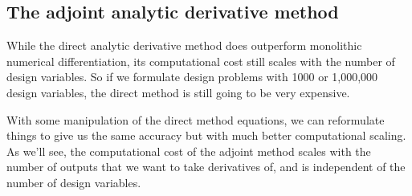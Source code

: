 \documentclass[conf]{new-aiaa}
\begin{document}
    
    \subsection{The adjoint analytic derivative method}

    While the direct analytic derivative method does outperform monolithic numerical differentiation, its computational cost still scales with the number of design variables. 
    So if we formulate design problems with 1000 or 1,000,000 design variables, the direct method is still going to be very expensive. 

    With some manipulation of the direct method equations, we can reformulate things to give us the same accuracy but with much better computational scaling. 
    As we'll see, the computational cost of the adjoint method scales with the number of outputs that we want to take derivatives of, and is independent of the number of design variables. 
\end{document}
